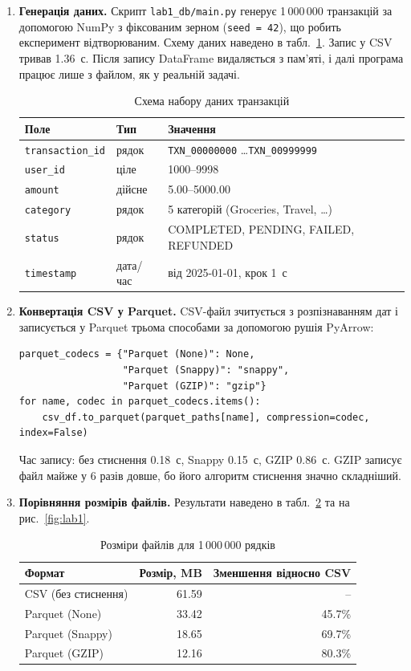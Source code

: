 \begin{enumerate}
  \item \textbf{Генерація даних.} Скрипт \texttt{lab1\_db/main.py} генерує 1\,000\,000 транзакцій за допомогою NumPy з фіксованим зерном (\texttt{seed = 42}), що робить експеримент відтворюваним. Схему даних наведено в табл.~\ref{tab:schema}. Запис у CSV тривав 1.36~с. Після запису DataFrame видаляється з пам'яті, і далі програма працює лише з файлом, як у реальній задачі.

\begin{table}[H]
\centering
\caption{Схема набору даних транзакцій}
\label{tab:schema}
\begin{tabular}{lll}
\toprule
Поле & Тип & Значення \\
\midrule
\texttt{transaction\_id} & рядок & \texttt{TXN\_00000000} \dots \texttt{TXN\_00999999} \\
\texttt{user\_id} & ціле & 1000--9998 \\
\texttt{amount} & дійсне & 5.00--5000.00 \\
\texttt{category} & рядок & 5 категорій (Groceries, Travel, \dots) \\
\texttt{status} & рядок & COMPLETED, PENDING, FAILED, REFUNDED \\
\texttt{timestamp} & дата/час & від 2025-01-01, крок 1~с \\
\bottomrule
\end{tabular}
\end{table}

  \item \textbf{Конвертація CSV у Parquet.} CSV-файл зчитується з розпізнаванням дат і записується у Parquet трьома способами за допомогою рушія PyArrow:
\begin{Verbatim}
parquet_codecs = {"Parquet (None)": None,
                  "Parquet (Snappy)": "snappy",
                  "Parquet (GZIP)": "gzip"}
for name, codec in parquet_codecs.items():
    csv_df.to_parquet(parquet_paths[name], compression=codec, index=False)
\end{Verbatim}
  Час запису: без стиснення 0.18~с, Snappy 0.15~с, GZIP 0.86~с. GZIP записує файл майже у 6 разів довше, бо його алгоритм стиснення значно складніший.

  \item \textbf{Порівняння розмірів файлів.} Результати наведено в табл.~\ref{tab:sizes} та на рис.~\ref{fig:lab1}.

\begin{table}[H]
\centering
\caption{Розміри файлів для 1\,000\,000 рядків}
\label{tab:sizes}
\begin{tabular}{lrr}
\toprule
Формат & Розмір, MB & Зменшення відносно CSV \\
\midrule
CSV (без стиснення) & 61.59 & -- \\
Parquet (None) & 33.42 & 45.7\% \\
Parquet (Snappy) & 18.65 & 69.7\% \\
Parquet (GZIP) & 12.16 & 80.3\% \\
\bottomrule
\end{tabular}
\end{table}


\end{enumerate}
